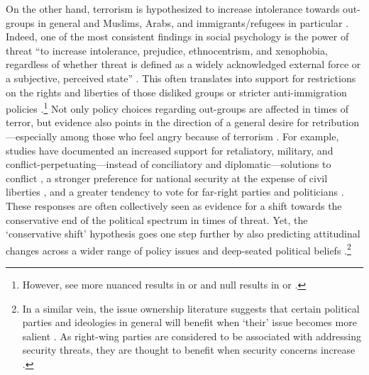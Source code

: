 On the other hand, terrorism is hypothesized to increase intolerance towards out-groups in general \citep[e.g.,][]{Echebarria-Echabe2006} and Muslims, Arabs, and immigrants/refugees in particular \citep[e.g.,][]{Panagopoulos2006, Argyrides2004, Ciftci2012, Hopkins2010a, Ferwerda2017}. Indeed, one of the most consistent findings in social psychology is the power of threat ``to increase intolerance, prejudice, ethnocentrism, and xenophobia, regardless of whether threat is defined as a widely acknowledged external force or a subjective, perceived state” \citep[][p. 594]{Huddy2005}. This often translates into support for restrictions on the rights and liberties of those disliked groups \citep[e.g.,][]{Davis2007} or stricter anti-immigration policies \citep[e.g.,][]{Kim2016}.\footnote{However, see more nuanced results in \cite{Legewie2013} or \cite{Nussio2019} and null results in \cite{Castanhosilva2018} or \cite{Larsen2020}.} Not only policy choices regarding out-groups are affected in times of terror, but evidence also points in the direction of a general desire for retribution---especially among those who feel angry because of terrorism \citep{Wayne2018}. For example, studies have documented an increased support for retaliatory, military, and conflict-perpetuating---instead of conciliatory and diplomatic---solutions to conflict \citep{Bar-Tal2001, Rovenpor2019}, a stronger preference for national security at the expense of civil liberties \citep{Davis2004}, and a greater tendency to vote for far-right parties and politicians \citep{Vasilopoulos2019c}. These responses are often collectively seen as evidence for a shift towards the conservative end of the political spectrum in times of threat. Yet, the `conservative shift' hypothesis goes one step further by also predicting attitudinal changes across a wider range of policy issues and deep-seated political beliefs \citep[such as one's general ideological leaning;][see also Section \ref{sec:122}]{Jost2003, Jost2017a}.\footnote{In a similar vein, the issue ownership literature suggests that certain political parties and ideologies in general will benefit when `their' issue becomes more salient \citep{Petrocik1996, Seeberg2017}. As right-wing parties are considered to be associated with addressing security threats, they are thought to benefit when security concerns increase \citep{GETMANSKY2014, Aytac2019a}.} 


